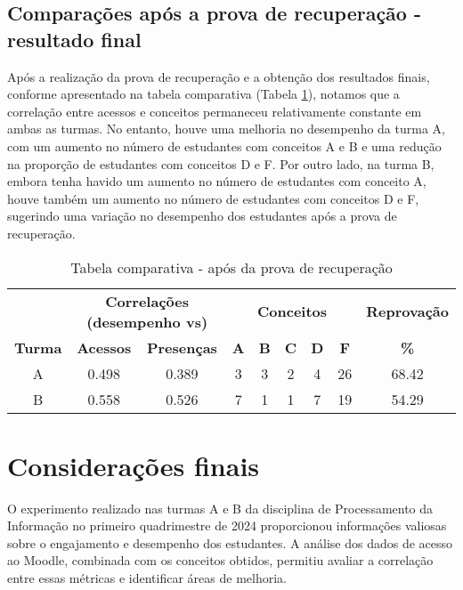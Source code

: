 \subsection{Comparações após a prova de recuperação - resultado final}

Após a realização da prova de recuperação e a obtenção dos resultados finais, conforme apresentado na tabela comparativa (Tabela \ref{tab:apos-recuperacao}), notamos que a correlação entre acessos e conceitos permaneceu relativamente constante em ambas as turmas. No entanto, houve uma melhoria no desempenho da turma A, com um aumento no número de estudantes com conceitos A e B e uma redução na proporção de estudantes com conceitos D e F. Por outro lado, na turma B, embora tenha havido um aumento no número de estudantes com conceito A, houve também um aumento no número de estudantes com conceitos D e F, sugerindo uma variação no desempenho dos estudantes após a prova de recuperação.

\begin{table}[htbp]
    \centering
    \caption{Tabela comparativa - após da prova de recuperação}
    \label{tab:apos-recuperacao}
    \begin{tabular}{|c|c|c|c|c|c|c|c|c|}
      \hline
      \rowcolor[HTML]{EFEFEF} 
      & \multicolumn{2}{c|}{\cellcolor[HTML]{C0C0C0}\textbf{Correlações (desempenho vs)}} & \multicolumn{5}{c|}{\cellcolor[HTML]{C0C0C0}\textbf{Conceitos}} & \cellcolor[HTML]{C0C0C0}\textbf{Reprovação} \\
      \cline{2-3} \cline{4-8} \cline{9-9}
      \rowcolor[HTML]{EFEFEF} 
      \textbf{Turma} & \textbf{Acessos} & \textbf{Presenças} & \textbf{A} & \textbf{B} & \textbf{C} & \textbf{D} & \textbf{F} & \textbf{\%} \\
      \hline
      A & 0.498 & 0.389 & 3 & 3 & 2 & 4 & 26 & 68.42 \\
      \hline
      B & 0.558 & 0.526 & 7 & 1 & 1 & 7 & 19 & 54.29 \\
      \hline
    \end{tabular}
\end{table}

\section{Considerações finais}

O experimento realizado nas turmas A e B da disciplina de Processamento da Informação no primeiro quadrimestre de 2024 proporcionou informações valiosas sobre o engajamento e desempenho dos estudantes. A análise dos dados de acesso ao Moodle, combinada com os conceitos obtidos, permitiu avaliar a correlação entre essas métricas e identificar áreas de melhoria.

